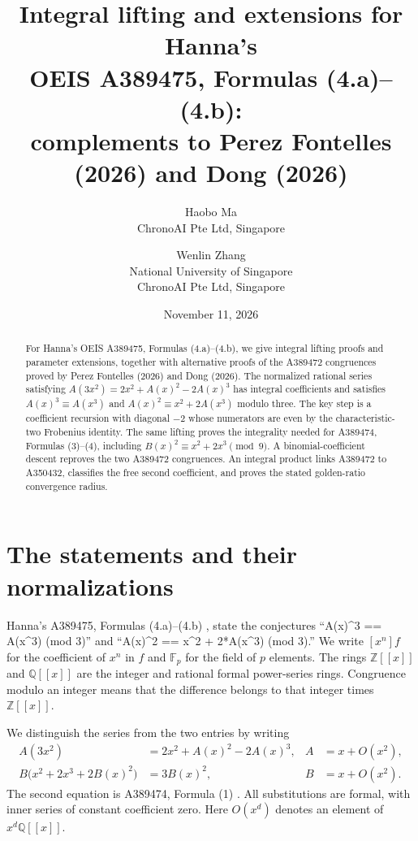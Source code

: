 \documentclass[11pt]{article}
\title{Integral lifting and extensions for Hanna's\\
OEIS A389475, Formulas (4.a)--(4.b):\\
complements to Perez Fontelles (2026) and Dong (2026)}
\author{Haobo Ma\\\small ChronoAI Pte Ltd, Singapore
\and Wenlin Zhang\\\small National University of Singapore\\\small ChronoAI Pte Ltd, Singapore}
\date{November 11, 2026}
\newcommand{\Z}{\mathbb Z}
\newcommand{\Q}{\mathbb Q}
\newcommand{\Fp}{\mathbb F}
\begin{document}
\maketitle
\begin{abstract}
For Hanna's OEIS A389475, Formulas (4.a)--(4.b), we give integral
lifting proofs and parameter extensions, together with alternative proofs
of the A389472 congruences proved by Perez Fontelles (2026) and Dong (2026).
The normalized rational series satisfying
$A(3x^2)=2x^2+A(x)^2-2A(x)^3$ has integral coefficients and satisfies
$A(x)^3\equiv A(x^3)$ and $A(x)^2\equiv x^2+2A(x^3)$ modulo three.
The key step is a coefficient recursion with diagonal $-2$ whose numerators
are even by the characteristic-two Frobenius identity.
The same lifting proves the integrality needed for A389474, Formulas
(3)--(4), including $B(x)^2\equiv x^2+2x^3\pmod9$.
A binomial-coefficient descent reproves the two A389472 congruences.
An integral product links A389472 to A350432, classifies the free second
coefficient, and proves the stated golden-ratio convergence radius.
\end{abstract}

\section{The statements and their normalizations}

Hanna's A389475, Formulas (4.a)--(4.b) \cite{hanna475}, state the
conjectures ``A(x)\^{}3 == A(x\^{}3) (mod 3)'' and
``A(x)\^{}2 == x\^{}2 + 2*A(x\^{}3) (mod 3).''
We write $[x^n]f$ for the coefficient of $x^n$ in $f$ and $\Fp_p$
for the field of $p$ elements. The rings $\Z[[x]]$ and $\Q[[x]]$
are the integer and rational formal power-series rings. Congruence modulo
an integer means that the difference belongs to that integer times $\Z[[x]]$.

We distinguish the series from the two entries by writing
\begin{align}
 A(3x^2)&=2x^2+A(x)^2-2A(x)^3, & A&=x+O(x^2), \label{eq:A}\\
 B\bigl(x^2+2x^3+2B(x)^2\bigr)&=3B(x)^2, & B&=x+O(x^2).
 \label{eq:B}
\end{align}
The second equation is A389474, Formula (1) \cite{hanna474}.
All substitutions are formal, with inner series of constant coefficient zero.
Here $O(x^d)$ denotes an element of $x^d\Q[[x]]$.
\end{document}
